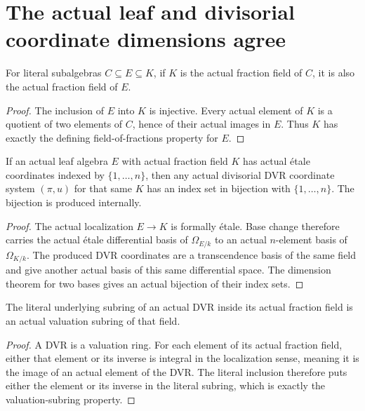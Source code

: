\section{The actual leaf and divisorial coordinate dimensions agree}

\begin{lemma}\label{lem:sc0-intermediate-actual-fraction-field}
\leanok
For literal subalgebras $C\subseteq E\subseteq K$, if $K$ is the actual
fraction field of $C$, it is also the actual fraction field of $E$.
\end{lemma}
\begin{proof}
The inclusion of $E$ into $K$ is injective. Every actual element of $K$ is
a quotient of two elements of $C$, hence of their actual images in $E$.
Thus $K$ has exactly the defining field-of-fractions property for $E$.
\end{proof}

\begin{lemma}\label{lem:sc0-actual-leaf-dvr-coordinate-index}
\leanok
{}
If an actual leaf algebra $E$ with actual fraction field $K$ has actual
\'etale coordinates indexed by $\{1,\ldots,n\}$, then any actual divisorial
DVR coordinate system $(\pi,u)$ for that same $K$ has an index set in
bijection with $\{1,\ldots,n\}$. The bijection is produced internally.
\end{lemma}
\begin{proof}
The actual localization $E\to K$ is formally \'etale. Base change therefore
carries the actual \'etale differential basis of $\Omega_{E/k}$ to an actual
$n$-element basis of $\Omega_{K/k}$. The produced DVR coordinates are a
transcendence basis of the same field and give another actual basis of this
same differential space. The dimension theorem for two bases gives an
actual bijection of their index sets.
\end{proof}

\begin{lemma}\label{lem:sc0-actual-dvr-valuation-subring}
\leanok
The literal underlying subring of an actual DVR inside its actual fraction
field is an actual valuation subring of that field.
\end{lemma}
\begin{proof}
A DVR is a valuation ring. For each element of its actual fraction field,
either that element or its inverse is integral in the localization sense,
meaning it is the image of an actual element of the DVR. The literal
inclusion therefore puts either the element or its inverse in the literal
subring, which is exactly the valuation-subring property.
\end{proof}
